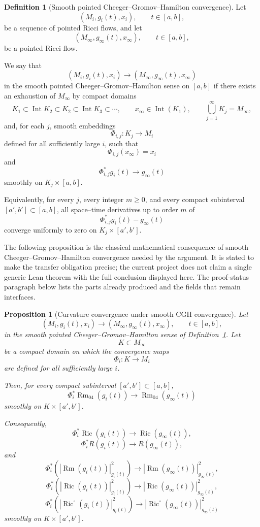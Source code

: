 \documentclass[11pt]{article}
\theoremstyle{plain}
\newtheorem{proposition}[theorem]{Proposition}
\theoremstyle{definition}
\newtheorem{definition}[theorem]{Definition}
\theoremstyle{remark}
\newcommand{\Ric}{\operatorname{Ric}}
\newcommand{\Rm}{\operatorname{Rm}}
\newcommand{\norm}[1]{\left|#1\right|}
\begin{document}
\begin{definition}[Smooth pointed Cheeger--Gromov--Hamilton convergence]
\label{def:cgh-convergence}
Let
\[
(M_i,g_i(t),x_i),
\qquad
 t\in [a,b],
\]
be a sequence of pointed Ricci flows, and let
\[
(M_\infty,g_\infty(t),x_\infty),
\qquad
 t\in [a,b],
\]
be a pointed Ricci flow.

We say that
\[
(M_i,g_i(t),x_i)
\longrightarrow
(M_\infty,g_\infty(t),x_\infty)
\]
in the smooth pointed Cheeger--Gromov--Hamilton sense on $[a,b]$ if there
exists an exhaustion of $M_\infty$ by compact domains
\[
K_1\subset \operatorname{Int}K_2\subset K_2
\subset \operatorname{Int}K_3\subset\cdots,
\qquad
x_\infty\in \operatorname{Int}(K_1),
\qquad
\bigcup_{j=1}^\infty K_j=M_\infty,
\]
and, for each $j$, smooth embeddings
\[
\Phi_{i,j}:K_j\to M_i
\]
defined for all sufficiently large $i$, such that
\[
\Phi_{i,j}(x_\infty)=x_i
\]
and
\[
\Phi_{i,j}^*g_i(t)\longrightarrow g_\infty(t)
\]
smoothly on $K_j\times [a,b]$.

Equivalently, for every $j$, every integer $m\ge 0$, and every compact
subinterval $[a',b']\subset [a,b]$, all space--time derivatives up to order $m$
of
\[
\Phi_{i,j}^*g_i(t)-g_\infty(t)
\]
converge uniformly to zero on $K_j\times [a',b']$.
\end{definition}

The following proposition is the classical mathematical consequence of smooth
Cheeger--Gromov--Hamilton convergence needed by the argument.  It is stated to
make the transfer obligation precise; the current project does not claim a
single generic Lean theorem with the full conclusion displayed here.  The
proof-status paragraph below lists the parts already produced and the fields
that remain interfaces.

\begin{proposition}[Curvature convergence under smooth CGH convergence]
\label{lem:cgh-curvature-convergence}
Let
\[
(M_i,g_i(t),x_i)\to (M_\infty,g_\infty(t),x_\infty),
\qquad
 t\in [a,b],
\]
in the smooth pointed Cheeger--Gromov--Hamilton sense of
Definition~\ref{def:cgh-convergence}. Let
\[
K\subset M_\infty
\]
be a compact domain on which the convergence maps
\[
\Phi_i:K\to M_i
\]
are defined for all sufficiently large $i$.

Then, for every compact subinterval $[a',b']\subset [a,b]$,
\[
\Phi_i^*\Rm_{04}(g_i(t))\to \Rm_{04}(g_\infty(t))
\]
smoothly on $K\times [a',b']$.

Consequently,
\[
\Phi_i^*\Ric(g_i(t))\to \Ric(g_\infty(t)),
\]
\[
\Phi_i^*R(g_i(t))\to R(g_\infty(t)),
\]
and
\[
\Phi_i^*\left(\norm{\Rm(g_i(t))}_{g_i(t)}^2\right)
\to
\norm{\Rm(g_\infty(t))}_{g_\infty(t)}^2,
\]
\[
\Phi_i^*\left(\norm{\Ric(g_i(t))}_{g_i(t)}^2\right)
\to
\norm{\Ric(g_\infty(t))}_{g_\infty(t)}^2,
\]
\[
\Phi_i^*\left(\norm{\Ric^\circ(g_i(t))}_{g_i(t)}^2\right)
\to
\norm{\Ric^\circ(g_\infty(t))}_{g_\infty(t)}^2
\]
smoothly on $K\times [a',b']$.
\end{proposition}
\end{document}
